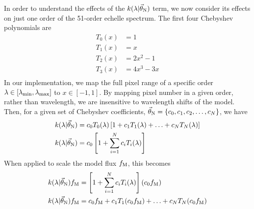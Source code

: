 \documentclass[preprint]{aastex} %
\newcommand{\vt}{\vec{\theta}}
\newcommand{\vN}{\vt_{\rm N}}
\newcommand{\fM}{f_{\rm M}}
\begin{document}
In order to understand the effects of the $k(\lambda | \vN)$ term, we now consider its effects on just one order of the 51-order echelle spectrum. The first four Chebyshev polynomials are 
\begin{align*}
  T_0(x) &= 1\\
  T_1(x) &= x\\
  T_2(x) &= 2 x^2 - 1\\
  T_3(x) &= 4 x^3 - 3x\\
\end{align*}
In our implementation, we map the full pixel range of a specific order $\lambda \in [\lambda_{\rm min}, \lambda_{\rm max}]$ to $x \in [-1, 1]$. By mapping pixel number in a given order, rather than wavelength, we are insensitive to wavelength shifts of the model. Then, for a given set of Chebyshev coefficients, $\vN = \{ c_0, c_1, c_2, \ldots, c_N \}$, we have 
\begin{align}
  k(\lambda | \vN) &= c_0 T_0(\lambda) \left [1 + c_1 T_1(\lambda) + \ldots + c_N T_N(\lambda) \right ]\\
  k(\lambda | \vN) &= c_0 \left [1 + \sum^N_{i = 1} c_i T_i(\lambda) \right ]
  \label{eqn:k_new}
\end{align}
When applied to scale the model flux $\fM$, this becomes
\begin{align}
  k(\lambda | \vN) \fM &=  \left [1 + \sum^N_{i = 1} c_i T_i(\lambda) \right ] (c_0 \fM)\\
  k(\lambda | \vN) \fM &= c_0 \fM + c_1 T_1 (c_0 \fM) + \ldots + c_N T_N (c_0 \fM)
\end{align}
\end{document}
